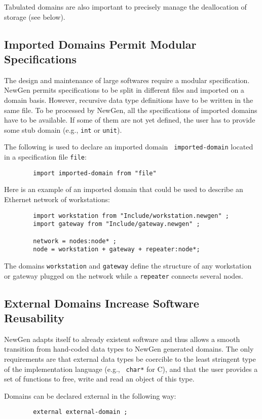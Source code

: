Tabulated domains are also important to precisely
manage the deallocation of storage (see below).

\subsection{Imported Domains Permit Modular Specifications}
\label{import}
The design and maintenance of large softwares require a modular
specification. NewGen permits specifications to be split in different
files and imported on a domain basis. However, recursive data type
definitions have to be written in the same file.  To be processed by
NewGen, all the specifications of imported domains have to be available.
If some of them are not yet defined, the user has to provide some stub
domain (e.g., {\tt int} or {\tt unit}).

The following is used to declare an imported domain {\tt
imported-domain} located in a specification file {\tt file}:
\begin{verbatim}
        import imported-domain from "file"
\end{verbatim}

Here is an example of an imported domain that could be used to
describe an Ethernet network of workstations:
\begin{verbatim}
        import workstation from "Include/workstation.newgen" ;
        import gateway from "Include/gateway.newgen" ;
 
        network = nodes:node* ;
        node = workstation + gateway + repeater:node*;
\end{verbatim}
The domains {\tt workstation} and {\tt gateway} define the structure of
any workstation or gateway plugged on the network while a {\tt repeater}
connects several nodes.

\subsection{External Domains Increase Software Reusability}

NewGen adapts itself to already existent software and thus allows a
smooth transition from hand-coded data types to NewGen generated
domains. The only requirements are that external data types be coercible
to the least stringent type of the implementation language (e.g., {\tt
char*} for C), and that the user provides a set of functions to free,
write and read an object of this type.

Domains can be declared external in the following way:
\begin{verbatim}
        external external-domain ;
\end{verbatim}

